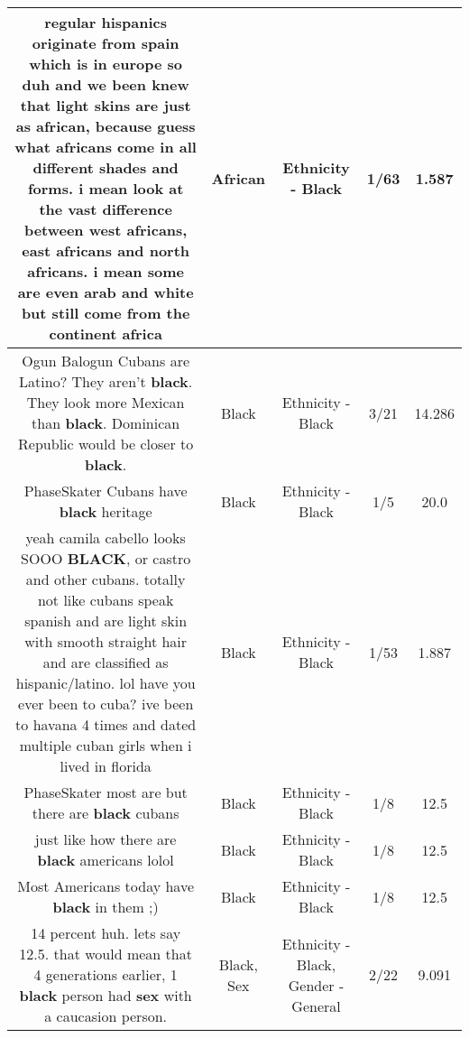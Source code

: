\documentclass[11pt]{article}
\newlength\mylength
\begin{document}
\begin{center}
\begin{longtable}{|C{.65\mylength}|C{.30\mylength}|C{.12\mylength}|C{.12\mylength}|C{.12\mylength}|}
  \small regular hispanics originate from spain which is in europe so duh and we been knew that light skins are just as \textbf{african}, because guess what africans come in all different shades and forms. i mean look at the vast difference between west africans, east africans and north africans. i mean some are even arab and white but still come from the continent africa\normalsize   & African & Ethnicity - Black & 1/63 & 1.587 \\  \hline
  \small Ogun Balogun Cubans are Latino? They aren't \textbf{black}. They look more Mexican than \textbf{black}. Dominican Republic would be closer to \textbf{black}.\normalsize   & Black & Ethnicity - Black & 3/21 & 14.286 \\  \hline
  \small PhaseSkater Cubans have \textbf{black} heritage\normalsize   & Black & Ethnicity - Black & 1/5 & 20.0 \\  \hline
  \small yeah camila cabello looks SOOO \textbf{BLACK}, or castro and other cubans. totally not like cubans speak spanish and are light skin with smooth straight hair and are classified as hispanic/latino. lol have you ever been to cuba? ive been to havana 4 times and dated multiple cuban girls when i lived in florida\normalsize   & Black & Ethnicity - Black & 1/53 & 1.887 \\  \hline
  \small PhaseSkater most are but there are \textbf{black} cubans\normalsize   & Black & Ethnicity - Black & 1/8 & 12.5 \\  \hline
  \small just like how there are \textbf{black} americans lolol\normalsize   & Black & Ethnicity - Black & 1/8 & 12.5 \\  \hline
  \small Most Americans today have \textbf{black} in them ;)\normalsize   & Black & Ethnicity - Black & 1/8 & 12.5 \\  \hline
  \small 14 percent huh. lets say 12.5. that would mean that 4 generations earlier, 1 \textbf{black} person had \textbf{sex} with a caucasion person.\normalsize   & Black, Sex & Ethnicity - Black, Gender - General & 2/22 & 9.091 \\  \hline

\end{longtable}
\end{center}
\end{document}
